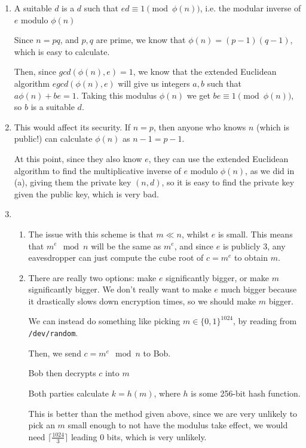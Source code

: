 


\begin{enumerate}[label=(\alph*)]
  \item
    A suitable $d$ is a $d$ such that $ed \equiv 1 \pmod{\phi(n)}$, i.e. the modular inverse of $e$ modulo $\phi(n)$

    Since $n = pq$, and $p,q$ are prime, we know that $\phi(n) = (p-1)(q-1)$, which is easy to calculate.

    Then, since $gcd(\phi(n), e) = 1$, we know that the extended Euclidean algorithm $egcd(\phi(n), e)$ will give us integers $a,b$ such that $a\phi(n) + be = 1$. Taking this modulus $\phi(n)$ we get $be \equiv 1 \pmod{\phi(n)}$, so $b$ is a suitable $d$.

  \item
    This would affect its security. If $n=p$, then anyone who knows $n$ (which is public!) can calculate $\phi(n)$ as $n-1 = p-1$.

    At this point, since they also know $e$, they can use the extended Euclidean algorithm to find the multiplicative inverse of $e$ modulo $\phi(n)$, as we did in (a), giving them the private key $(n,d)$, so it is easy to find the private key given the public key, which is very bad.

  \item
    \begin{enumerate}[label=(\roman*)]
      \item
        The issue with this scheme is that $m \ll n$, whilst $e$ is small. This means that $m^e \mod{n}$ will be the same as $m^e$, and since $e$ is publicly 3, any eavesdropper can just compute the cube root of $c = m^e$ to obtain $m$.

      \item
        There are really two options: make $e$ significantly bigger, or make $m$ significantly bigger. We don't really want to make $e$ much bigger because it drastically slows down encryption times, so we should make $m$ bigger.

        We can instead do something like picking $m \in \{0,1\}^{1024}$, by reading from \texttt{/dev/random}.

        Then, we send $c = m^e \mod{n}$ to Bob.

        Bob then decrypts $c$ into $m$

        Both parties calculate $k = h(m)$, where $h$ is some 256-bit hash function.

        This is better than the method given above, since we are very unlikely to pick an $m$ small enough to not have the modulus take effect, we would need $\lceil \frac{1024}{3} \rceil$ leading 0 bits, which is very unlikely.



        
    \end{enumerate}

        
\end{enumerate}

